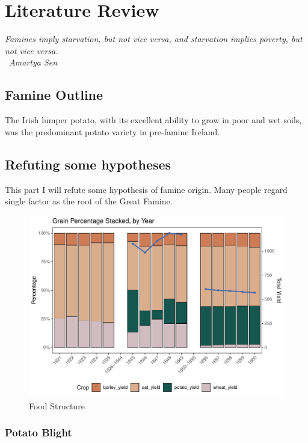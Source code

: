 \chapter{Literature Review}

\vspace{.3cm}

\textit{Famines imply starvation, but not vice versa, and starvation implies poverty, but not vice versa.\\
\textemdash\ Amartya Sen}

\section{Famine Outline}

The Irish lumper potato, with its excellent ability to grow in poor and wet soils, was the predominant potato variety in pre-famine Ireland.

\section{Refuting some hypotheses}

This part I will refute some hypothesis of famine origin. Many people regard single factor as the root of the Great Famine.

\begin{figure}[h]
    \centering
    \caption{Food Structure}
    \includegraphics[width=.95\textwidth]{../03_outputs/food_structure.pdf}
\end{figure}

\subsection{Potato Blight}

